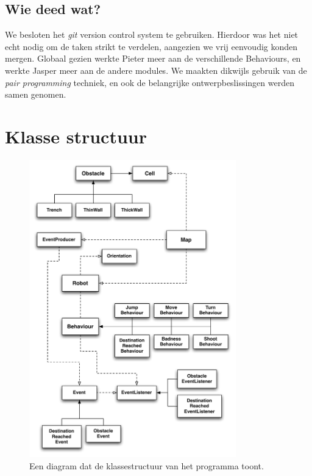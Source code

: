 \documentclass[a4paper]{article}
\begin{document}
\subsection*{Wie deed wat?}
We besloten het \emph{git} version control system te gebruiken. Hierdoor was het
niet echt nodig om de taken strikt te verdelen, aangezien we vrij eenvoudig
konden mergen. Globaal gezien werkte Pieter meer aan de verschillende
Behaviours, en werkte Jasper meer aan de andere modules. We maakten dikwijls
gebruik van de \emph{pair programming} techniek, en ook de belangrijke
ontwerpbeslissingen werden samen genomen.

\newpage
\section*{Klasse structuur}
\begin{figure}[h!]
\begin{center}
\includegraphics[width=0.8\textwidth]{diagram.pdf}
\caption{Een diagram dat de klassestructuur van het programma toont.}
\label{fig:diagram}
\end{center}
\end{figure}
\end{document}
